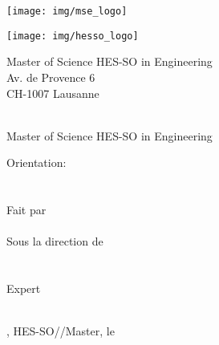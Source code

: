 
\begin{titlepage}
{\selectfont
	\begin{flushright}
		\begin{minipage}{0.5\textwidth}
			\begin{flushleft}
				\texttt{[image: img/mse\_logo]}
			\end{flushleft}
		\end{minipage}%
		\begin{minipage}{0.5\textwidth}
			\begin{flushright}
				\texttt{[image: img/hesso\_logo]}
			\end{flushright}
		\end{minipage}
		\begin{flushleft}
			\footnotesize
			Master of Science HES-SO in Engineering \\
			Av. de Provence 6 \\
			CH-1007 Lausanne
		\end{flushleft}
		~\\[0.5cm]

		{
		\Huge Master of Science HES-SO in Engineering\\[0.5cm]
		}

		{
		\LARGE Orientation: \Orientation\\[0.5cm]
		~\\[1cm]
		}
		{
			\Huge
			\ThesisTitle \\[1.5cm]
		}
		{
			\large
			Fait par\\[-0.3cm]
			\Huge \Author \\[0.8cm]
		}
		{
			\large
			Sous la direction de \\
			\Advisor \\
			\AdvisorResearchUnit \\[0.5cm]
		}
		{
			\large
			Expert \\
			\Expert \\
			\ExpertLab
		}
		\vfill

		{\large \Place, HES-SO//Master, le \Date}

	\end{flushright}
}
\restoregeometry
\end{titlepage}
